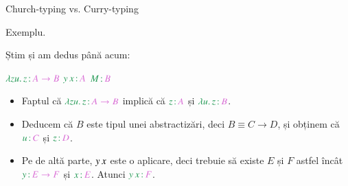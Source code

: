 \documentclass[xcolor=pdftex,romanian,colorlinks]{beamer}
\begin{document}
\begin{frame}{Church-typing vs. Curry-typing}

{\color{True} Exemplu.}

Știm  și am dedus până acum:
\vspace{-.3cm}
\begin{center}
{\color{True}$\type{\abs{zu}{z}}{A \to B}$} \hspace{.4cm} 
{\color{True}$\type{\app{y}{x}}{A}$} \hspace{.4cm} 
{\color{True}$\type{M}{B}$}  \hspace{.4cm} 
\end{center}
\vspace{-.3cm}

\begin{itemize}
	\item Faptul că {\color{True}$\type{\abs{zu}{z}}{A \to B}$} implică că {\color{True}$\type{z}{A}$} și {\color{True}$\type{\abs{u}{z}}{B}$}.
	\item Deducem că $B$ este tipul unei abstractizări, deci $B \equiv C \to D$, și obținem că {\color{True}$\type{u}{C}$} și {\color{True}$\type{z}{D}$}.
	\item Pe de altă parte, {$y\, x$} este o aplicare, deci trebuie să existe $E$ și $F$ astfel încât {\color{True}$\type{y}{E \to F}$} și {\color{True}$\type{x}{E}$}. Atunci {\color{True}$\type{\app{y}{x}}{F}$}.
\end{itemize}
\end{frame}
\end{document}
